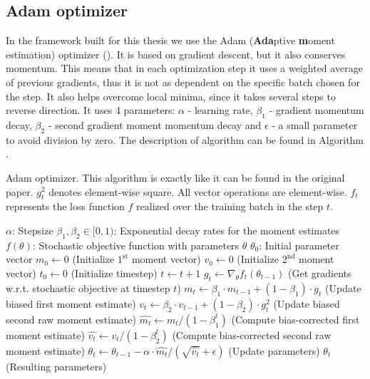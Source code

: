 \subsection{Adam optimizer}
\label{section:adam}
In the framework built for this thesis we use the Adam (\textbf {Ada}ptive \textbf{m}oment estimation) optimizer (\cite{adam}). It is based on gradient descent, but it also conserves momentum. This means that in each optimization step it uses a weighted average of previous gradients, thus it is not as dependent on the specific batch chosen for the step. It also helps overcome local minima, since it takes several steps to reverse direction. It uses 4 parameters: $\alpha$ - learning rate, $\beta_1$ - gradient momentum decay, $\beta_2$ - second gradient moment momentum decay and $\epsilon$ - a small parameter to avoid division by zero. The description of algorithm can be found in Algorithm . 
\begin{algorithm}[h]
\caption{Adam optimizer. This algorithm is exactly like it can be found in the original paper. $g_t^2$ denotes element-wise square. All vector operations are element-wise. $f_t$ represents the loss function $f$ realized over the training batch in the step $t$.}
\label{alg:adam}
\begin{algorithmic}
\REQUIRE $\alpha$: Stepsize
\REQUIRE $\beta_1, \beta_2 \in [0,1)$: Exponential decay rates for the moment estimates
\REQUIRE $f(\theta)$: Stochastic objective function with parameters $\theta$
\REQUIRE $\theta_0$: Initial parameter vector
\STATE $m_0 \leftarrow 0$ (Initialize $1^{\text{st}}$ moment vector)
\STATE $v_0 \leftarrow 0$ (Initialize $2^{\text{nd}}$ moment vector)
\STATE $t_0 \leftarrow 0$ (Initialize timestep)
	\STATE $t\leftarrow t+1$
	\STATE $g_t \leftarrow \nabla_\theta f_t(\theta_{t-1})$ (Get gradients w.r.t. stochastic objective at timestep $t$)
	\STATE $m_t\leftarrow \beta_1\cdot m_{t-1}+(1-\beta_1)\cdot g_t$ (Update biased first moment estimate)
	\STATE $v_t\leftarrow \beta_2\cdot v_{t-1}+(1-\beta_2)\cdot g_t^2$ (Update biased second raw moment estimate)
	\STATE $\widehat{m_t}\leftarrow m_t/(1-\beta_1^t)$ (Compute bias-corrected first moment estimate)
	\STATE $\widehat{v_t}\leftarrow v_t/(1-\beta_2^t)$ (Compute bias-corrected second raw moment estimate)
	\STATE $\theta_t\leftarrow\theta_{t-1}-\alpha\cdot \widehat{m_t}/(\sqrt{\widehat{v_t}}+\epsilon)$ (Update parameters)
\ENDWHILE
\RETURN $\theta_t$ (Resulting parameters)
\end{algorithmic}
\end{algorithm}

